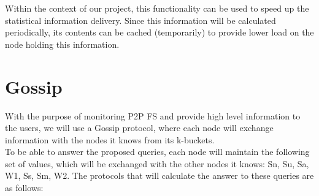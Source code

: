 \documentclass[times,9pt,article]{llncs}
\begin{document}
Within the context of our project, this functionality can be used to speed up
the statistical information delivery. Since this information will be calculated
periodically, its contents can be cached (temporarily) to provide lower load on
the node holding this information.

\section{Gossip}

With the purpose of monitoring P2P FS and provide high level information to the 
users, we will use a Gossip protocol, where each node will exchange information
with the nodes it knows from its k-buckets.\\
To be able to answer the proposed queries, each node will maintain the following
set of values, which will be exchanged with the other nodes it knows: Sn, Su, Sa,
W1, Ss, Sm, W2. The protocols that will calculate the answer to these queries are
as follows:
\end{document}
